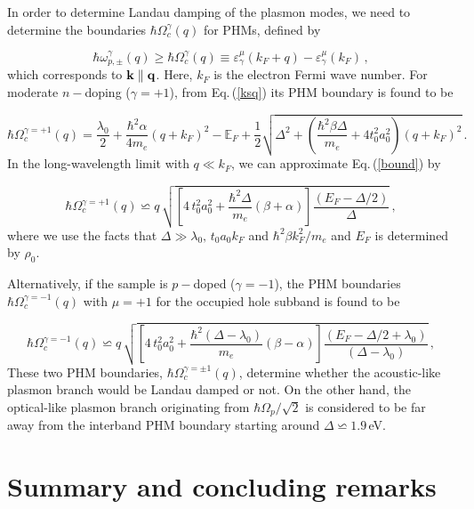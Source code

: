 \documentclass[aps,prb,showpacs]{revtex4}
\newcommand{\mbb}{\mathbb}
\newcommand{\pa}{\parallel}
\begin{document}
In order to determine Landau damping of the plasmon modes, we need to determine the boundaries $\hbar\Omega_c^\gamma(q)$ for PHMs, defined by 

\begin{equation}
\hbar \omega^\gamma_{p,\pm}(q) \geq \hbar\Omega_c^\gamma(q)\equiv\varepsilon_\gamma^\mu(k_F + q)-\varepsilon_\gamma^\mu(k_F) \, ,
\end{equation}
which corresponds to ${\bf k}\pa{\bf q}$. Here, $k_F$ is the electron Fermi wave number.
For moderate $n-$doping ($\gamma=+1$), from Eq.\,(\ref{ksq}) its PHM boundary is found to be

\begin{equation}
\hbar \Omega^{\gamma=+1}_c(q) =  
\frac{\lambda_0}{2} + \frac{\hbar^2\alpha}{4 m_e} \left(q + k_F\right)^2 -\mbb{E}_F+ 
\frac{1}{2}
\sqrt{
\Delta^2 + 
\left(
\frac{\hbar^2 \beta \Delta}{m_e} + 4  t_0^2 a_0^2\right) 
\left(q + k_F\right)^2}\, .
\label{bound}
\end{equation}
In the long-wavelength limit with $q \ll k_F$,  we can approximate Eq.\,(\ref{bound}) by

\begin{equation}
\hbar\Omega^{\gamma=+1}_c(q)\backsimeq q\,
\sqrt{
 \left[4\,t_0^2 a_0^2+\frac{\hbar^2\Delta}{m_e}(\beta+\alpha)\right]\frac{\left(E_F-\Delta/2\right)}{\Delta}}\, ,
\end{equation}
where we use the facts that $\Delta\gg\lambda_0,\,t_0a_0k_F$ and $\hbar^2\beta k_F^2/m_e$ and $E_F$ is determined by $\rho_0$.
\medskip

Alternatively, if the sample is $p-$doped ($\gamma=-1$), the PHM boundaries $\hbar\Omega_c^{\gamma=-1}(q)$ with $\mu=+1$ for the occupied hole subband is found to be

\begin{equation}
\hbar\Omega_c^{\gamma = -1}(q) \backsimeq q\,
\sqrt{
\left[4\,t_0^2 a_0^2+\frac{\hbar^2(\Delta-\lambda_0)}{m_e}(\beta-\alpha)\right]\frac{\left(E_F-\Delta/2+\lambda_0\right)}{(\Delta-\lambda_0)}}\, ,
\end{equation}
These two PHM boundaries, $\hbar\Omega_c^{\gamma =\pm 1}(q)$, determine whether the acoustic-like plasmon branch would be Landau damped or not. On the other hand, the optical-like plasmon
branch originating from $\hbar\Omega_p/\sqrt{2}$ is considered to be far away from the interband PHM boundary starting around $\Delta \backsimeq 1.9\,$eV.

\section{Summary and concluding remarks}
\label{sect4}
 
\end{document}
